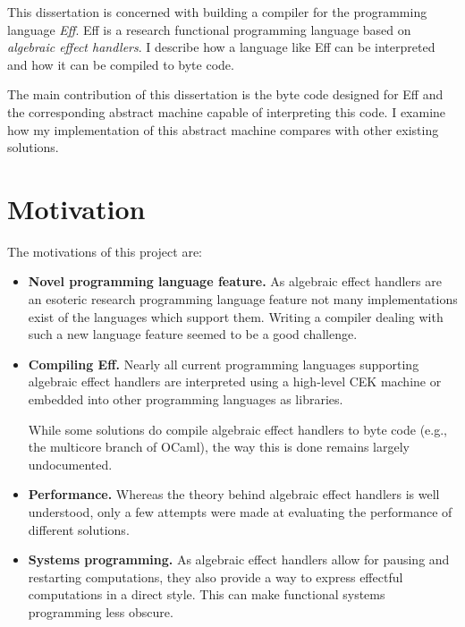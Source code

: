 \documentclass[class=article,crop=false,11pt]{standalone}
\begin{document}
This dissertation is concerned with building a compiler for the programming language \emph{Eff}.
Eff is a research functional programming language based on \emph{algebraic effect handlers}.
I describe how a language like Eff can be interpreted and how it can be compiled to byte code.

The main contribution of this dissertation is the byte code designed for Eff and
the corresponding abstract machine capable of interpreting this code.
I examine how my implementation of this abstract machine compares with other existing solutions.

\section{Motivation}

The motivations of this project are:
\begin{itemize}
\item \textbf{Novel programming language feature.} 
As algebraic effect handlers are an esoteric research programming language feature not many
implementations exist of the languages which support them. Writing a compiler dealing with 
such a new language feature seemed to be a good challenge.


\item \textbf{Compiling Eff.}
Nearly all current programming languages supporting algebraic effect handlers are
interpreted using a high-level CEK machine or embedded into other programming languages
as libraries.

While some solutions do compile algebraic effect handlers to byte code
(e.g., the multicore branch of OCaml), the way this is done remains largely undocumented.

\item \textbf{Performance.}
Whereas the theory behind algebraic effect handlers is well understood, only a
few attempts were made at evaluating the performance of different solutions.

\item \textbf{Systems programming.}
As algebraic effect handlers allow for pausing and restarting computations, they
also provide a way to express effectful computations in a direct style. This can make
functional systems programming less obscure.

\end{itemize}
\end{document}
